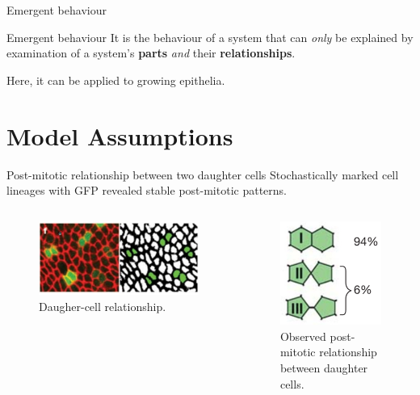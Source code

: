 \documentclass[aspectratio=169, 10pt]{beamer}
\begin{document}
\begin{frame}[fragile]{Emergent behaviour}  
  \begin{alertblock}{Emergent behaviour}
    \vspace{5pt}
    It is the behaviour of a system that can \emph{only} be explained by examination of a system's \textbf{parts} \emph{and} their \textbf{relationships}.
  \end{alertblock}
  Here, it can be applied to growing epithelia.
  
\end{frame}



\section{Model Assumptions}

\begin{frame}[fragile]{Post-mitotic relationship between two daughter cells}
  Stochastically marked cell lineages with GFP revealed stable post-mitotic patterns.     
  \begin{columns}[]
    \begin{figure}[b]
      \centering
      \includegraphics[width=\textwidth]{figures/daughter-cell-relationship.png}
      \caption{Daugher-cell relationship.}
      \label{}
    \end{figure}
        \begin{figure}[b]
            \centering
            \includegraphics[width=.4\textwidth]{figures/post-mitotic-relationship.png}
            \caption{Observed post-mitotic relationship between daughter cells.}
            \label{}
    \end{figure}
  \end{columns}  
\end{frame}
\end{document}

